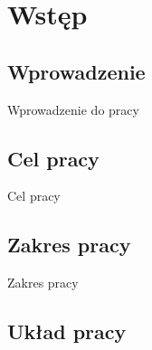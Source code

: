 \chapter{Wstęp}
\section{Wprowadzenie}
Wprowadzenie do pracy

\section{Cel pracy}
Cel pracy

\section{Zakres pracy}
Zakres pracy


\section{Układ pracy}

